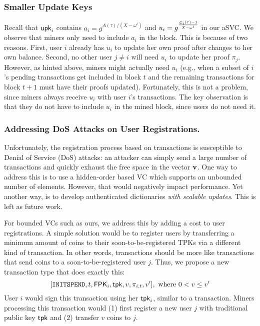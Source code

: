 \subsubsection{Smaller Update Keys}
\label{s:stateless-cryptocurrency:smaller-update-keys}
Recall that $\mathsf{upk}_i$ contains $a_i=g^{A(\tau)/(X-\omega^i)}$ and $u_i=g^{\frac{\mathcal{L}_i(\tau)-1}{X-\omega^i}}$ in our aSVC.
We observe that miners only need to include $a_i$ in the block.
This is because of two reasons.
First, user $i$ already has $u_i$ to update her own proof after changes to her own balance.
Second, no other user $j\ne i$ will need $u_i$ to update her proof $\pi_j$.
However, as hinted above, miners might actually need $u_i$
(e.g., when a subset of $i$'s pending transactions get included in block $t$ and the remaining transactions for block $t+1$ must have their proofs updated).
Fortunately, this is not a problem, since miners always receive $u_i$ with user $i$'s transactions.
The key observation is that they do not have to include $u_i$ in the mined block, since users do not need it.

\subsubsection{Addressing DoS Attacks on User Registrations.}
\label{s:stateless-cryptocurrency:dos-registration}

Unfortunately, the registration process based on \inittxn transactions is susceptible to Denial of Service (DoS) attacks:
an attacker can simply send a large number of \inittxn transactions and quickly exhaust the free space in the vector $\bm{\mathrm{v}}$.
One way to address this is to use a hidden-order based VC which supports an unbounded number of elements.
However, that would negatively impact performance.
Yet another way, is to develop authenticated dictionaries \textit{with scalable updates}.
This is left as future work.

For bounded VCs such as ours, we address this by adding a cost to user registrations.
A simple solution would be to register users by transferring a minimum amount of coins to their soon-to-be-registered TPKs via a different kind of \spendtxn transaction.
In other words, \inittxn transactions should be more like \spendtxn transactions that send coins to a soon-to-be-registered user $j$.
Thus, we propose a new \initspendtxn transaction type that does exactly this:
$$[\initspendtxn, t, \PK_i, \tpk,v,\pi_{i,t}, v'],\ \text{where}\ 0 < v \le v'$$
User $i$ would sign this \initspendtxn transaction using her $\mathsf{tpk}_i$, similar to a \spendtxn transaction.
Miners processing this transaction would (1) first register a new user $j$ with traditional public key $\mathsf{tpk}$ and (2) transfer $v$ coins to $j$.

